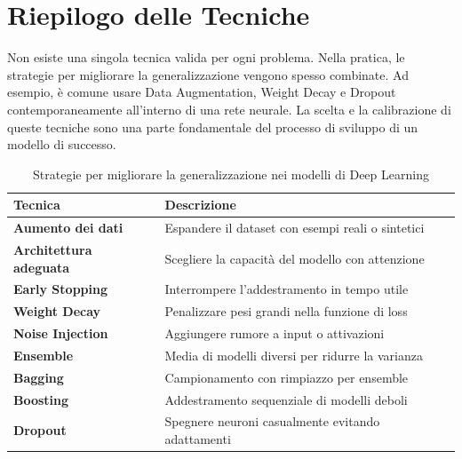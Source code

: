 \section{Riepilogo delle Tecniche}
Non esiste una singola tecnica valida per ogni problema. Nella pratica, le strategie per migliorare la generalizzazione vengono spesso combinate. Ad esempio, è comune usare Data Augmentation, Weight Decay e Dropout contemporaneamente all'interno di una rete neurale. La scelta e la calibrazione di queste tecniche sono una parte fondamentale del processo di sviluppo di un modello di successo.

\begin{table}[h]
    \centering
    \caption{Strategie per migliorare la generalizzazione nei modelli di Deep Learning}
    \begin{adjustbox}{width=\textwidth}
    \begin{tabular}{@{}l|l@{}}
    \toprule
    \textbf{Tecnica} & \textbf{Descrizione} \\
    \midrule
    \textbf{Aumento dei dati} & Espandere il dataset con esempi reali o sintetici \\
    \textbf{Architettura adeguata} & Scegliere la capacità del modello con attenzione \\
    \textbf{Early Stopping} & Interrompere l’addestramento in tempo utile \\
    \textbf{Weight Decay} & Penalizzare pesi grandi nella funzione di loss \\
    \textbf{Noise Injection} & Aggiungere rumore a input o attivazioni \\
    \textbf{Ensemble} & Media di modelli diversi per ridurre la varianza \\
    \textbf{Bagging} & Campionamento con rimpiazzo per ensemble \\
    \textbf{Boosting} & Addestramento sequenziale di modelli deboli \\
    \textbf{Dropout} & Spegnere neuroni casualmente evitando adattamenti \\
    \bottomrule
    \end{tabular}
    \end{adjustbox}
\end{table}
